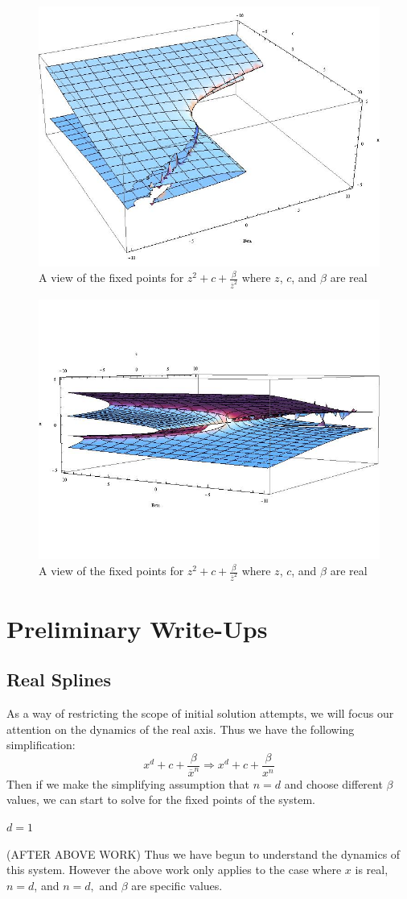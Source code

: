 \documentclass[10pt]{article}
\begin{document}
\begin{figure}[H]\centering\includegraphics[width=.6\textwidth]{fixed_points_real_view1.jpg}\caption{A view of the fixed points for $z^{2} + c + \frac{\beta}{ \overline{z}^{2}}$ where $z$, $c$, and $\beta$ are real}\end{figure}

\begin{figure}[H]\centering\includegraphics[width=.6\textwidth]{fixed_points_real_view2.jpg}\caption{A view of the fixed points for $z^{2} + c + \frac{\beta}{ \overline{z}^{2}}$ where $z$, $c$, and $\beta$ are real}\end{figure}





\section{Preliminary Write-Ups}
\subsection{}

\subsection{Real Splines}

As a way of restricting the scope of initial solution attempts, we will focus our attention on the dynamics of the real axis. Thus we have the following simplification:
\[
	x^d + c + \frac{\beta}{\overline{x}^n} \Rightarrow x^d + c + \frac{\beta}{x^n}
\]
Then if we make the simplifying assumption that $n = d$ and choose different $\beta$ values, we can start to solve for the fixed points of the system.

\underline{$d = 1$}



(AFTER ABOVE WORK) Thus we have begun to understand the dynamics of this system. However the above work only applies to the case where $x$ is real, $n = d$, and $n = d,$ and $\beta$ are specific values.
\end{document}
